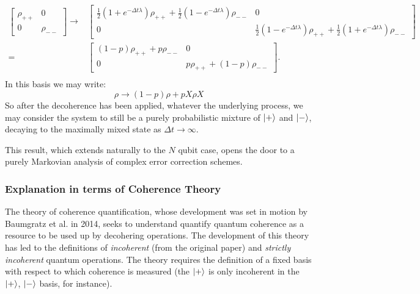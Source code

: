 \documentclass{report}
\begin{document}
\begin{appendices}
\begin{align*}
    \begin{bmatrix}
        \rho_{++} & 0\\ 0 & \rho_{--}
    \end{bmatrix}
    \longrightarrow
    &\begin{bmatrix}
        \frac{1}{2}(1+e^{-\Delta t \lambda})\rho_{++} + \frac{1}{2}(1-e^{-\Delta t \lambda})\rho_{--} & 0 \\
        0 & \frac{1}{2}(1-e^{-\Delta t \lambda})\rho_{++} + \frac{1}{2}(1+e^{-\Delta t \lambda})\rho_{--}
    \end{bmatrix}\\
    = &\begin{bmatrix}
        (1-p)\rho_{++} + p\rho_{--} & 0 \\
        0 & p\rho_{++} + (1-p)\rho_{--}
    \end{bmatrix}.\\
\end{align*}
In this basis we may write:
\begin{equation*}
    \rho \longrightarrow (1-p)\rho + p X\rho X
\end{equation*}
So after the decoherence has been applied, whatever the underlying process, we may consider the system to still be a purely probabilistic mixture of $\ket{+}$ and $\ket{-}$, decaying to the maximally mixed state as $\Delta t \rightarrow \infty$.

This result, which extends naturally to the $N$ qubit case, opens the door to a purely Markovian analysis of complex error correction schemes.

\subsubsection{Explanation in terms of Coherence Theory}
The theory of coherence quantification, whose development was set in motion by Baumgratz et al. in 2014\cite{Baumgratz2014}, seeks to understand quantify quantum coherence as a resource to be used up by decohering operations. The development of this theory has led to the definitions of \textit{incoherent} (from the original paper) and \textit{strictly incoherent} \cite{Yadin2016} quantum operations. The theory requires the definition of a fixed basis with respect to which coherence is measured (the $\ket{+}$ is only incoherent in the $\ket{+}$, $\ket{-}$ basis, for instance). 


\end{appendices}
\end{document}
